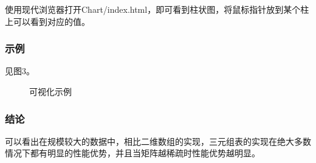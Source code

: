 \documentclass{article}
\begin{document}
使用现代浏览器打开Chart/index.html，即可看到柱状图，将鼠标指针放到某个柱上可以看到对应的值。

\subsubsection{示例}

见图3。

\begin{figure}[htbp]
    
    
    \caption{可视化示例}
    
\end{figure}

\subsubsection{结论}

可以看出在规模较大的数据中，相比二维数组的实现，三元组表的实现在绝大多数情况下都有明显的性能优势，并且当矩阵越稀疏时性能优势越明显。
\end{document}
